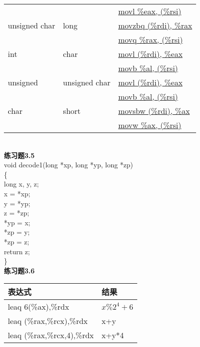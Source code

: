 \documentclass{article}
\begin{document}
\begin{CJK}{UTF8}{uyhei}
\begin{table}[htbp]
\begin{tabular}{|m{8em}<{\centering}|m{8em}<{\centering}|m{12em}<{\centering}|}
	&	&	\underline{movl \%eax, (\%rsi)}	\\
	unsigned char	&	long	&	\underline{movzbq (\%rdi), \%rax}	\\
	&	&	\underline{movq \%rax, (\%rsi)}	\\
	int	&	char	&	\underline{movl (\%rdi), \%eax}	\\
	&	&	\underline{movb \%al, (\%rsi)}	\\
	unsigned	&	unsigned char	&	\underline{movl (\%rdi), \%eax}	\\
	&	&	\underline{movb \%al, (\%rsi)}	\\
	char	&	short	&	\underline{movsbw (\%rdi), \%ax}	\\
	&	&	\underline{movw \%ax, (\%rsi)}	\\
	\hline
\end{tabular}
\end{table}	\\[2ex]
\newpage
\noindent\textbf{练习题3.5}	\\[2ex]
void decode1(long *xp, long *yp, long *zp)	\\
\{	\\
	\hspace*{4em}	long x, y, z;	\\
	\hspace*{4em}	x = *xp;	\\
	\hspace*{4em}	y = *yp;	\\
	\hspace*{4em}	z = *zp;	\\
	\hspace*{4em}	*yp = x;	\\
	\hspace*{4em}	*zp = y;	\\
	\hspace*{4em}	*zp = z;	\\
	\hspace*{4em}	return z;	\\
\}	\\[3ex]
\textbf{练习题3.6}	\\
\begin{table}[htbp]
\centering
\begin{tabular}{|m{18em}<{\centering}|m{10em}<{\centering}|}
	\hline
	表达式	&	结果	\\
	\hline
	leaq 6(\%ax),\%rdx	&	$x\%2^4+6$	\\
	\hline
	leaq (\%rax,\%rcx),\%rdx	&	x+y	\\
	\hline
	leaq (\%rax,\%rcx,4),\%rdx	&	x+y*4	\\

\end{tabular}
\end{table}
\end{CJK}
\end{document}
